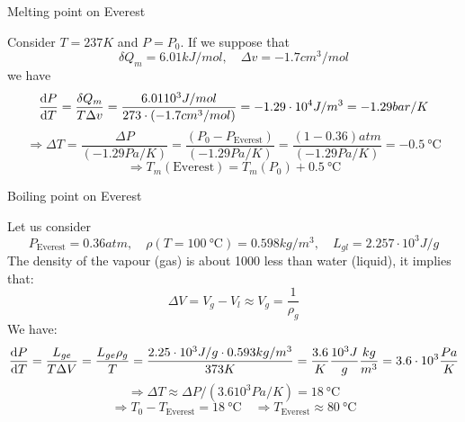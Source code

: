 \documentclass[../../Main/Main.tex]{subfiles}
\begin{document}
\begin{example}{Melting point on Everest}{}

Consider \( T = 237 K \) and \( P=P_0 \). If we suppose that
\begin{equation*}
\delta Q_m = 6.01 kJ/mol, \quad \Delta v = -1.7 cm^3 /mol    
\end{equation*}
we have
\begin{equation*}
  \dv{P}{T}  = \frac{\delta Q_m}{T \Delta v} = \frac{6.01 10^3 J/mol}{273 \cdot (-1.7 cm^3/mol)} = -1.29 \cdot 10^4 J/m^3 = -1.29 bar/K
  \label{eq:}
\end{equation*}
\begin{equation*}
  \Rightarrow \Delta T = \frac{\Delta P}{(-1.29 Pa/K)} = \frac{(P_0 - P_{\text{Everest}})}{(-1.29 Pa/K)} = \frac{(1-0.36)atm}{(-1.29 Pa/K)} = -0.5\SI{}{\celsius}
  \label{eq:}
\end{equation*}
\begin{equation*}
  \Rightarrow T_m ( \text{Everest}) = T_m (P_0) + 0.5\SI{}{\celsius}
  \label{eq:}
\end{equation*}
\end{example}

\begin{example}{Boiling point on Everest}{}

Let us consider
\begin{equation*}
 P_{\text{Everest}}= 0.36 atm, \quad \rho (T= 100\SI{}{\celsius})=0.598 kg/m^3, \quad
  L_{gl} = 2.257 \cdot 10^3 J/g
\end{equation*}
The density of the vapour (gas) is about 1000 less than water (liquid), it implies that: 
\begin{equation*}
 \Delta V = V_g - V_l \approx V_g = \frac{1}{\rho_g}   
\end{equation*}
 We have:
\begin{equation*}
  \dv{P}{T} = \frac{L_{ge}}{T \Delta V} = \frac{L_{ge} \rho _g}{T} = \frac{2.25 \cdot 10^3 J/g \cdot 0.593 kg/m^3}{373 K} = \frac{3.6}{K} \frac{10^3 J}{g} \frac{kg}{m^3} = 3.6 \cdot 10^3 \frac{Pa}{K} 
\end{equation*}
\begin{equation*}
  \Rightarrow \Delta T \approx \Delta P/(3.6 10^3 Pa/K) = 18 \SI{}{\celsius}   
  \label{eq:}
\end{equation*}
\begin{equation*}
 \Rightarrow T_0 - T_{\text{Everest}} = 18\SI{}{\celsius} \quad \Rightarrow T_{\text{Everest}}\approx 80\SI{}{\celsius}   
\end{equation*}
\end{example}
\end{document}
